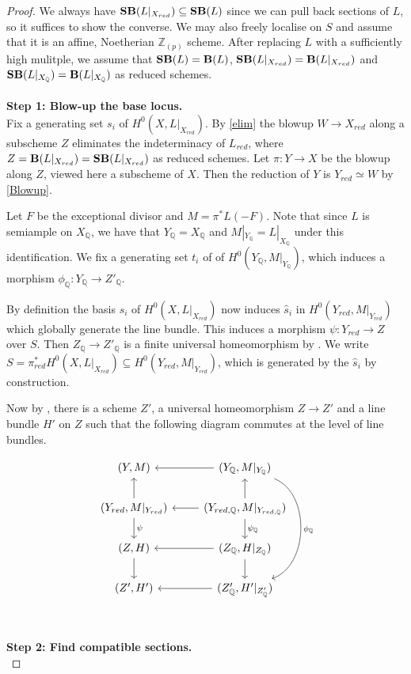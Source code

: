 \begin{proof}
	We always have $\mathbf{SB}(L|_{X_{red}}) \subseteq \mathbf{SB}(L)$ since we can pull back sections of $L$, so it suffices to show the converse. We may also freely localise on $S$ and assume that it is an affine, Noetherian $\mathbb{Z}_{(p)}$ scheme. After replacing $L$ with a sufficiently high mulitple, we assume that $\mathbf{SB}(L)=\mathbf{B}(L)$, $\mathbf{SB}(L|_{X_{red}})=\mathbf{B}(L|_{X_{red}})$ and $\mathbf{SB}(L|_{X_{\mathbb{Q}}})=\mathbf{B}(L|_{X_{\mathbb{Q}}})$ as reduced schemes.\\
	\\
	\textbf{Step 1: Blow-up the base locus.}\\
	
	Fix a generating set $s_{i}$ of $H^{0}(X,L|_{X_{red}})$. By \autoref{elim} the blowup $W\to X_{red}$ along a subscheme $Z$ eliminates the indeterminacy of $L_{red}$, where $Z=\mathbf{B}(L|_{X_{red}})=\mathbf{SB}(L|_{X_{red}})$ as reduced schemes. Let $\pi:Y \to X$ be the blowup along $Z$, viewed here a subscheme of $X$. Then the reduction of $Y$ is $Y_{red}\simeq W$ by \autoref{Blowup}.
	
	Let $F$ be the exceptional divisor and $M = \pi^{*}L(-F)$. Note that since $L$ is semiample on $X_{\mathbb{Q}}$, we have that $Y_{\mathbb{Q}}=X_{\mathbb{Q}}$ and $M|_{Y_{\mathbb{Q}}}=L|_{X_{\mathbb{Q}}}$ under this identification. We fix a generating set $t_{i}$ of of $H^{0}(Y_{\mathbb{Q}},M|_{Y_{\mathbb{Q}}})$, which induces a morphism $\phi_{\mathbb{Q}}\colon Y_{\mathbb{Q}} \to Z'_{\mathbb{Q}}$.
	
	By definition the basis $s_{i}$ of $H^{0}(X,L|_{X_{red}})$ now induces $\hat{s}_{i}$ in $H^{0}(Y_{red},M|_{Y_{red}})$ which globally generate the line bundle. This induces a morphism $\psi: Y_{red} \to Z$ over $S$. Then $Z_{\mathbb{Q}} \to Z'_{\mathbb{Q}}$ is a finite universal homeomorphism by \cite[Tag 02OG]{stacks-project}. We write $S=\pi^{*}_{red}H^{0}(X,L|_{X_{red}}) \subseteq H^{0}(Y_{red},M|_{Y_{red}})$, which is generated by the $\hat{s}_{i}$ by construction. 
	
	Now by \cite[Theorem 1.7, Corollary 4.20 and Lemma 2.20]{witaszek2020keels}, there is a scheme $Z'$, a universal homeomorphism $Z \to Z'$ and a line bundle $H'$ on $Z$ such that the following diagram commutes at the level of line bundles.
	
	\[\begin{tikzcd}
	{(Y,M)}                                 & {(Y_{\mathbb{Q}},M|_{Y_{\mathbb{Q}}})} \arrow[ddd, bend left=70, "\phi_{\mathbb{Q}}"] \arrow[l]     \\
	{(Y_{red},M|_{Y_{red}})} \arrow[d, "\psi"] \arrow[u] & {(Y_{red, \mathbb{Q}},M|_{Y_{red, \mathbb{Q}}})} \arrow[d, "\psi_{\mathbb{Q}}"] \arrow[u] \arrow[l] \\
	{(Z,H)} \arrow[d]                       & {(Z_{\mathbb{Q}},H|_{Z_{\mathbb{Q}}})} \arrow[l] \arrow[d]                    \\
	{(Z',H')}                               & {(Z'_{\mathbb{Q}},H'|_{Z'_{\mathbb{Q}}})} \arrow[l]                            
	\end{tikzcd}\]\\
	\\
	\textbf{Step 2: Find compatible sections.}\\
	

\end{proof}
